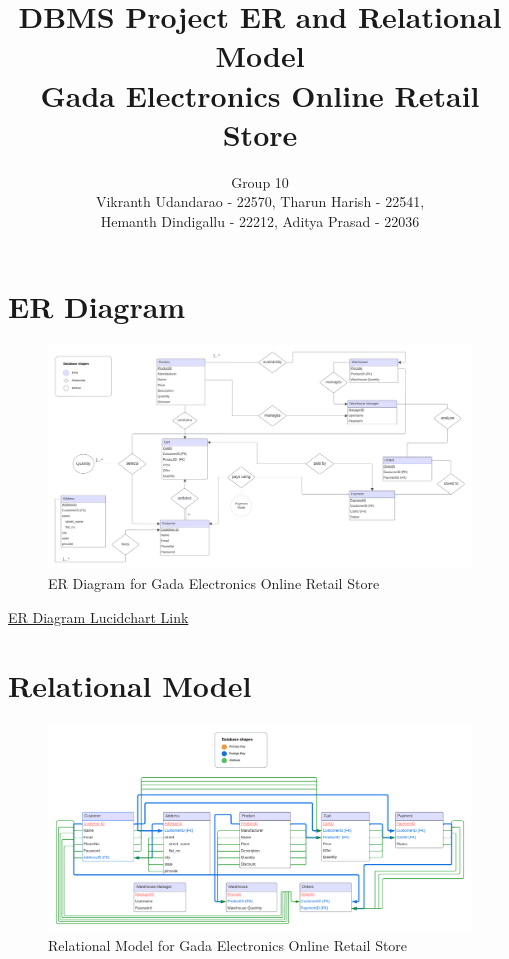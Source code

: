 \documentclass[12pt]{article}
\begin{document}
\title{\textbf{DBMS Project ER and Relational Model\\ Gada Electronics Online Retail Store}}
\author{Group 10 \\ Vikranth Udandarao - 22570, Tharun Harish - 22541,\\ Hemanth Dindigallu - 22212, Aditya Prasad - 22036}
\date{}
\maketitle

\section*{ER Diagram}

\begin{figure}[h]
    \centering
    \includegraphics[width=\textwidth]{ER Model.png}
    \caption{ER Diagram for Gada Electronics Online Retail Store}
    \label{fig:er_diagram}
\end{figure}

\begin{enumerate}
    \href{https://lucid.app/lucidchart/dbe56fd5-655a-4600-acc3-cc27ac2c8d4d/edit?viewport_loc=-1491%2C-1362%2C4992%2C2421%2C0_0&invitationId=inv_fde4bde2-1525-455f-a9b6-ca4cec350a77}{ER Diagram Lucidchart Link}
\end{enumerate}

\clearpage

\section*{Relational Model}

\begin{figure}[h]
    \centering
    \includegraphics[width=\textwidth]{Relational Model.png}
    \caption{Relational Model for Gada Electronics Online Retail Store}
    \label{fig:relational_model}
\end{figure}
\end{document}
